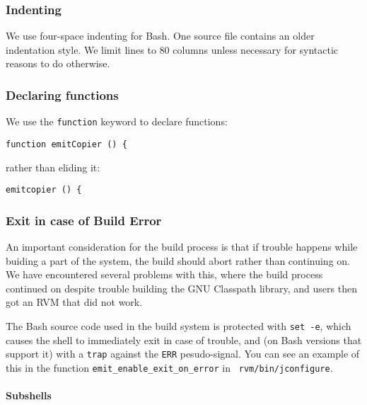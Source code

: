 \subsubsection{Indenting}

We use four-space indenting for Bash.  One source file contains an
older indentation style.
We limit lines to 80 columns unless necessary for syntactic reasons to
do otherwise. 

\subsubsection{Declaring functions}

We use the {\tt function} keyword to declare functions:
\begin{verbatim}
function emitCopier () {
\end{verbatim}
rather than eliding it:
\begin{verbatim}
emitcopier () {
\end{verbatim}

\subsubsection{Exit in case of Build Error}

An important consideration for the build process is that if trouble
happens while buiding a part of the system, the build should abort
rather than continuing on.  We have encountered several problems with this,
where the build process continued on despite trouble building the GNU
Classpath library, and users then got an RVM that did not work.  

The Bash source code used in the build system is protected with 
{\tt set~-e}, which causes the shell to immediately exit in case of
trouble, and (on Bash versions that support it) with a {\tt trap}
against the {\tt ERR} pesudo-signal.  You can see an example of this
in the function {\tt emit\_\-enable\_\-exit\_\-on\_\-err\-or} in {\tt
rvm/\-bin/\-j\-con\-fi\-gure}.  

\paragraph{Subshells}

